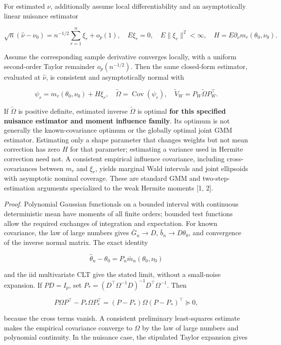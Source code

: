 \documentclass[
  11pt,
]{article}
\begin{document}
For estimated \(\nu\), additionally assume local differentiability and
an asymptotically linear nuisance estimator

\[
\sqrt n(\widehat\nu-\nu_0)=n^{-1/2}\sum_{r=1}^n\xi_r+o_p(1),
\quad E\xi_r=0,\quad E\|\xi_r\|^2<\infty,
\quad H=E\partial_\nu m_r(\theta_0,\nu_0).
\]

Assume the corresponding sample derivative converges locally, with a
uniform second-order Taylor remainder \(o_p(n^{-1/2})\). Then the same
closed-form estimator, evaluated at \(\widehat\nu\), is consistent and
asymptotically normal with

\[
\psi_r=m_r(\theta_0,\nu_0)+H\xi_r,
\quad \widetilde\Omega=\operatorname{Cov}(\psi_r),
\quad \widetilde V_W=P_W\widetilde\Omega P_W^\top.
\]

If \(\widetilde\Omega\) is positive definite, estimated inverse
\(\widetilde\Omega\) is optimal \textbf{for this specified nuisance
estimator and moment influence family}. Its optimum is not generally the
known-covariance optimum or the globally optimal joint GMM estimator.
Estimating only a shape parameter that changes weights but not mean
correction has zero \(H\) for that parameter; estimating a variance used
in Hermite correction need not. A consistent empirical influence
covariance, including cross-covariances between \(m_r\) and \(\xi_r\),
yields marginal Wald intervals and joint ellipsoids with asymptotic
nominal coverage. These are standard GMM and two-step-estimation
arguments specialized to the weak Hermite moments {[}1, 2{]}.

\emph{Proof.} Polynomial Gaussian functionals on a bounded interval with
continuous deterministic mean have moments of all finite orders; bounded
test functions allow the required exchanges of integration and
expectation. For known covariance, the law of large numbers gives
\(\bar G_n\to D\), \(\bar b_n\to D\theta_0\), and convergence of the
inverse normal matrix. The exact identity

\[
\widehat\theta_n-\theta_0=P_n\bar m_n(\theta_0,\nu_0)
\]

and the iid multivariate CLT give the stated limit, without a
small-noise expansion. If \(P D=I_p\), set
\(P_*= (D^\top\Omega^{-1}D)^{-1}D^\top\Omega^{-1}\). Then

\[
P\Omega P^\top-P_*\Omega P_*^\top
=(P-P_*)\Omega(P-P_*)^\top\succeq0,
\]

because the cross terms vanish. A consistent preliminary least-squares
estimate makes the empirical covariance converge to \(\Omega\) by the
law of large numbers and polynomial continuity. In the nuisance case,
the stipulated Taylor expansion gives
\end{document}
